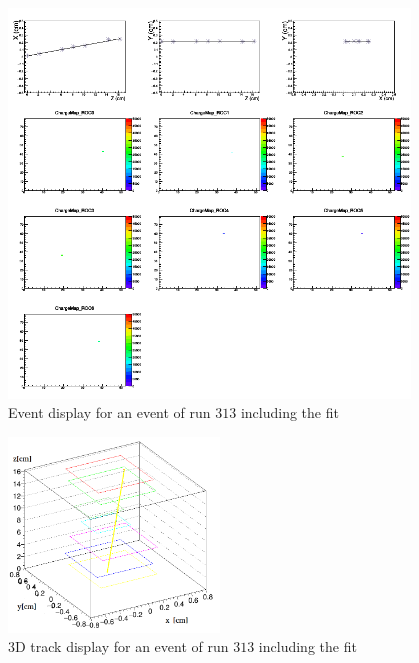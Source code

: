 \documentclass[british,11pt,a4paper]{memoir}
\begin{document}
\begin{figure}[ht]
	\centering
	\includegraphics[width=0.95\textwidth]{tracking/event}
	\caption{Event display for an event of run $313$ including the fit}
	\label{pevent}
\end{figure}\no
\begin{figure}[ht]
	\centering
	\includegraphics[width=0.5\textwidth]{tracking/3D}
	\caption{3D track display for an event of run $313$ including the fit}
	\label{p3D}
\end{figure}\no
\end{document}
